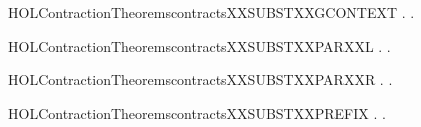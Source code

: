 \newcommand{\HOLContractionTheoremscontractsXXrules}{\UseVerbatim{HOLContractionTheoremscontractsXXrules}}
\begin{SaveVerbatim}{HOLContractionTheoremscontractsXXSUBSTXXGCONTEXT}
\HOLTokenTurnstile{} \HOLSymConst{\HOLTokenForall{}} .    \HOLSymConst{\HOLTokenImp{}} \HOLSymConst{\HOLTokenForall{}}.   \HOLSymConst{\HOLTokenImp{}}     
\end{SaveVerbatim}
\newcommand{\HOLContractionTheoremscontractsXXSUBSTXXGCONTEXT}{\UseVerbatim{HOLContractionTheoremscontractsXXSUBSTXXGCONTEXT}}
\begin{SaveVerbatim}{HOLContractionTheoremscontractsXXSUBSTXXPARXXL}
\HOLTokenTurnstile{} \HOLSymConst{\HOLTokenForall{}} .    \HOLSymConst{\HOLTokenImp{}} \HOLSymConst{\HOLTokenForall{}}.  \HOLSymConst{\ensuremath{\parallel}}    \HOLSymConst{\ensuremath{\parallel}} 
\end{SaveVerbatim}
\newcommand{\HOLContractionTheoremscontractsXXSUBSTXXPARXXL}{\UseVerbatim{HOLContractionTheoremscontractsXXSUBSTXXPARXXL}}
\begin{SaveVerbatim}{HOLContractionTheoremscontractsXXSUBSTXXPARXXR}
\HOLTokenTurnstile{} \HOLSymConst{\HOLTokenForall{}} .    \HOLSymConst{\HOLTokenImp{}} \HOLSymConst{\HOLTokenForall{}}.  \HOLSymConst{\ensuremath{\parallel}}    \HOLSymConst{\ensuremath{\parallel}} 
\end{SaveVerbatim}
\newcommand{\HOLContractionTheoremscontractsXXSUBSTXXPARXXR}{\UseVerbatim{HOLContractionTheoremscontractsXXSUBSTXXPARXXR}}
\begin{SaveVerbatim}{HOLContractionTheoremscontractsXXSUBSTXXPREFIX}
\HOLTokenTurnstile{} \HOLSymConst{\HOLTokenForall{}} .    \HOLSymConst{\HOLTokenImp{}} \HOLSymConst{\HOLTokenForall{}}.   
\end{SaveVerbatim}
